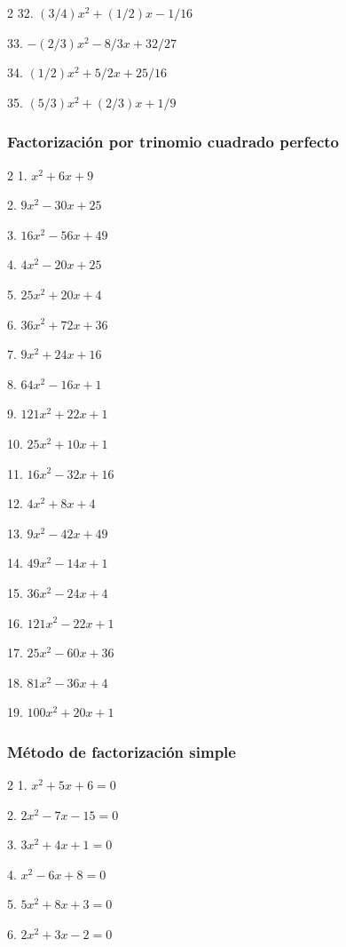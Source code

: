 \documentclass[12pt]{article}
\begin{document}
{\begin{multicols}{2}
32. $(3/4)x^2 + (1/2)x - 1/16$

33. $-(2/3)x^2 - 8/3x + 32/27$

34. $(1/2)x^2 + 5/2x + 25/16$

35. $(5/3)x^2 + (2/3)x + 1/9$
\end{multicols}

\subsubsection{Factorización por trinomio cuadrado
perfecto}\label{factorizaciuxf3n-por-trinomio-cuadrado-perfecto}
\begin{multicols}{2}
1. $x^2 + 6x + 9$

2. $9x^2 - 30x + 25$

3. $16x^2 - 56x + 49$

4. $4x^2 - 20x + 25$

5. $25x^2 + 20x + 4$

6. $36x^2 + 72x + 36$

7. $9x^2 + 24x + 16$

8. $64x^2 - 16x + 1$

9. $121x^2 + 22x + 1$

10. $25x^2 + 10x + 1$

11. $16x^2 - 32x + 16$

12. $4x^2 + 8x + 4$

13. $9x^2 - 42x + 49$

14. $49x^2 - 14x + 1$

15. $36x^2 - 24x + 4$

16. $121x^2 - 22x + 1$

17. $25x^2 - 60x + 36$

18. $81x^2 - 36x + 4$

19. $100x^2 + 20x + 1$

\end{multicols}


\subsubsection{Método de factorización
simple}\label{muxe9todo-de-factorizaciuxf3n-simple}
\begin{multicols}{2}
1. $x^2 + 5x + 6 = 0$

2. $2x^2 - 7x - 15 = 0$

3. $3x^2 + 4x + 1 = 0$

4. $x^2 - 6x + 8 = 0$

5. $5x^2 + 8x + 3 = 0$

6. $2x^2 + 3x - 2 = 0$


\end{multicols}}
\end{document}
